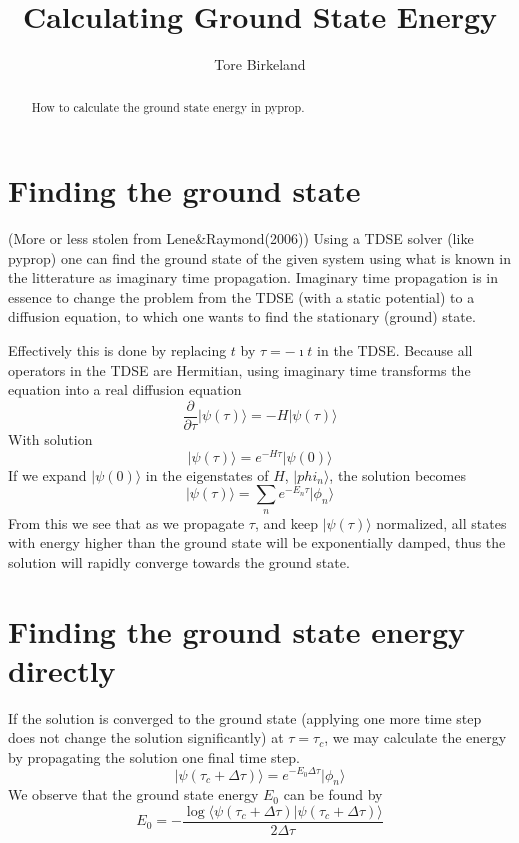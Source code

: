 \documentclass[a4paper,10pt]{article}
\title{Calculating Ground State Energy}
\author{Tore Birkeland}
\newcommand{\ket}[1]{\ensuremath{\vert #1 \rangle}}
\newcommand{\braketnorm}[1]{\ensuremath{\langle #1 \vert #1 \rangle}}
\newcommand{\partialdiff}[2][]{\ensuremath{\frac{\partial#1}{\partial{#2}}}}
\begin{document}
\maketitle

\begin{abstract}
How to calculate the ground state energy in pyprop.
\end{abstract}

\section{Finding the ground state}
(More or less stolen from Lene\&Raymond(2006))
Using a TDSE solver (like pyprop) one can find the ground state of the given system
using what is known in the litterature as imaginary time propagation. Imaginary time
propagation is in essence to change the problem from the TDSE (with a static potential)
to a diffusion equation, to which one wants to find the stationary (ground) state.

Effectively this is done by replacing $t$ by $\tau = - \imath t$ in the TDSE. Because
all operators in the TDSE are Hermitian, using imaginary time transforms the equation 
into a real diffusion equation
\begin{equation}
	\partialdiff{\tau} \ket{\psi(\tau)} = - H \ket{\psi(\tau)}
\end{equation}
With solution
\begin{equation}
	\ket{\psi(\tau)} = e^{- H \tau} \ket{\psi(0)}
\end{equation}
If we expand $\ket{\psi(0)}$ in the eigenstates of $H$, $\ket{phi_n}$, the solution
becomes
\begin{equation}
	\ket{\psi(\tau)} = \sum_n e^{- E_n \tau} \ket{\phi_n} 
\end{equation}
From this we see that as we propagate $\tau$, and keep $\ket{\psi(\tau)}$ normalized,
all states with energy higher than the ground state will be exponentially damped, thus
the solution will rapidly converge towards the ground state.

\section{Finding the ground state energy directly}
If the solution is converged to the ground state (applying one more time step does not 
change the solution significantly) at $\tau = \tau_c$, we may calculate the energy by propagating 
the solution one final time step.
\begin{equation}
	\ket{\psi(\tau_c + \Delta \tau)} =  e^{- E_0 \Delta \tau} \ket{\phi_n} 
\end{equation}
We observe that the ground state energy $E_0$ can be found by
\begin{equation}
	E_0 = - \frac{\log \braketnorm{\psi(\tau_c + \Delta \tau)}}{2 \Delta \tau}
\end{equation}
\end{document}
